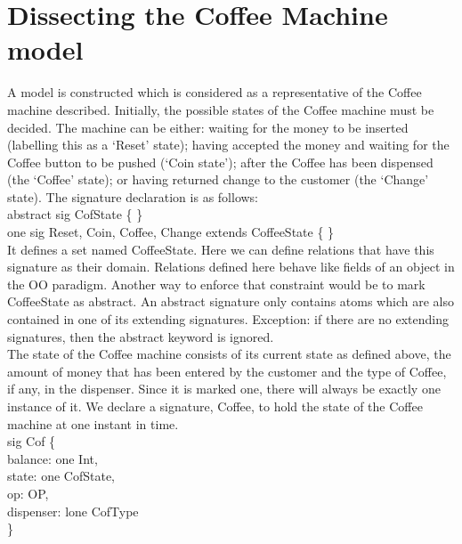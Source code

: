 \documentclass[a4paper,12pt]{extarticle}
\begin{document}
\section{Dissecting the Coffee Machine model}
\label{Dissecting Cooffee machine}
A model is constructed which is considered as a representative of the Coffee machine described. Initially, the possible states of the Coffee machine must be decided. The machine can be either: waiting for the money to be inserted (labelling this as a `Reset’ state); having accepted the money and waiting for the Coffee button to be pushed (`Coin state’); after the Coffee has been dispensed (the ‘Coffee’ state); or having returned change to the customer (the `Change’ state). The signature declaration is as follows:\\
abstract sig CofState \{ \}\\
one sig Reset, Coin, Coffee, Change extends CoffeeState \{ \}\\
It defines a set named CoffeeState. Here we can define relations that have this signature as their domain. Relations defined here behave like fields of an object in the OO paradigm. Another way to enforce that constraint would be to mark CoffeeState as abstract. An abstract signature only contains atoms which are also contained in one of its extending signatures. Exception: if there are no extending signatures, then the abstract keyword is ignored.\\
The state of the Coffee machine consists of its current state as defined above, the amount of money that has been entered by the customer and the type of Coffee, if any, in the dispenser. Since it is marked one, there will always be exactly one instance of it. We declare a signature, Coffee, to hold the state of the Coffee machine at one instant in time.\\

sig Cof \{ \\

balance: one Int,\\
state: one CofState,\\
op: OP,\\
dispenser: lone CofType\\

\}\\
\end{document}
